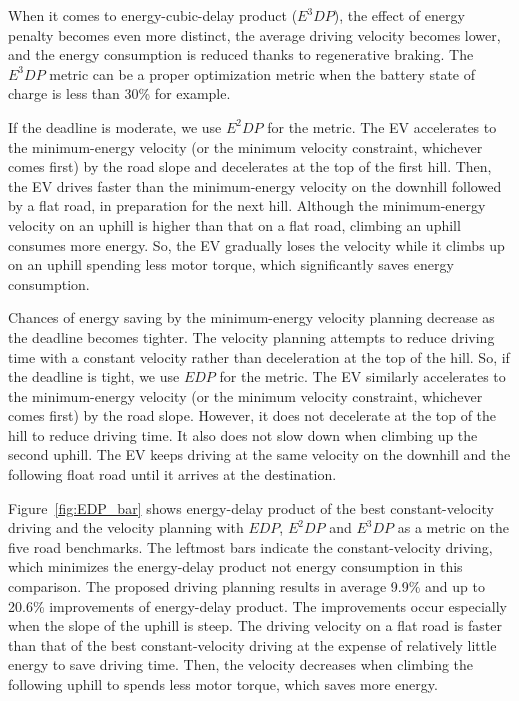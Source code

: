 \documentclass{IEEEtran}
\begin{document}
When it comes to energy-cubic-delay product ($E^3DP$), the effect of energy penalty becomes even more distinct, the average driving velocity becomes lower, and the energy consumption is reduced thanks to regenerative braking. The $E^3DP$ metric can be a proper optimization metric when the battery state of charge is less than 30\% for example.

If the deadline is moderate, we use $E^2DP$ for the metric. The EV accelerates to the minimum-energy velocity (or the minimum velocity constraint, whichever comes first) by the road slope and decelerates at the top of the first hill. Then, the EV drives faster than the minimum-energy velocity on the downhill followed by a  flat road, in preparation for the next hill. Although the minimum-energy velocity on an uphill is higher than that on a flat road, climbing an uphill consumes more energy. So, the EV gradually loses the velocity while it climbs up on an uphill spending less motor torque, which significantly saves energy consumption. %

Chances of energy saving by the minimum-energy velocity planning decrease as the deadline becomes tighter. 
The velocity planning attempts to reduce driving time with a constant velocity rather than deceleration at the top of the hill.
%
So, if the deadline is tight, we use $EDP$ for the metric. The EV similarly accelerates to the minimum-energy velocity (or the minimum velocity constraint, whichever comes first) by the road slope. However, it does not decelerate at the top of the hill to reduce driving time. It also does not slow down when climbing up the second uphill. The EV keeps driving at the same velocity on the downhill and the following float road until it arrives at the destination.

Figure~\ref{fig:EDP_bar} shows energy-delay product of the best constant-velocity driving and the velocity planning with $EDP$, $E^2DP$ and $E^3DP$ as a metric on the five road benchmarks. The leftmost bars indicate the constant-velocity driving, which minimizes the energy-delay product not energy consumption in this comparison. The proposed driving planning results in average 9.9\% and up to 20.6\% improvements of energy-delay product. The improvements occur especially when the slope of the uphill is steep. The driving velocity on a flat road is faster than that of the best constant-velocity driving at the expense of relatively little energy to save driving time. Then, the velocity decreases when climbing the following uphill to spends less motor torque, which saves more energy.
\end{document}
